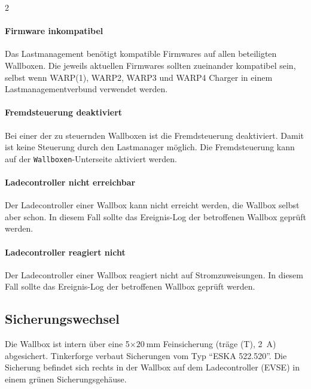 \documentclass[a4paper,10pt]{article}
\begin{document}
\begin{multicols*}{2}
    \paragraph*{Firmware inkompatibel}
    Das Lastmanagement benötigt kompatible Firmwares auf allen beteiligten Wallboxen. Die jeweils aktuellen Firmwares sollten zueinander kompatibel sein,
    selbst wenn WARP(1), WARP2, WARP3 und WARP4 Charger in einem Lastmanagementverbund verwendet werden.

    \paragraph*{Fremdsteuerung deaktiviert}
    Bei einer der zu steuernden Wallboxen ist die Fremdsteuerung deaktiviert. Damit ist keine Steuerung durch den Lastmanager möglich. Die Fremdsteuerung kann auf der \texttt{Wallboxen}-Unterseite aktiviert werden.

    \paragraph*{Ladecontroller nicht erreichbar}
    Der Ladecontroller einer Wallbox kann nicht erreicht werden, die Wallbox
	selbst aber schon. In diesem Fall sollte das Ereignis-Log der betroffenen
	Wallbox geprüft werden.

    \paragraph*{Ladecontroller reagiert nicht}
    Der Ladecontroller einer Wallbox reagiert nicht auf Stromzuweisungen. In diesem Fall sollte das Ereignis-Log der betroffenen Wallbox geprüft werden.

    \subsection{Sicherungswechsel}
    Die Wallbox ist intern über eine 5$\times\SI{20}{\milli\meter}$
	Feinsicherung (träge (T), \SI{2}{\ampere}) abgesichert.
    Tinkerforge verbaut Sicherungen vom Typ \enquote{ESKA 522.520}.
	Die Sicherung befindet sich rechts in der Wallbox auf dem Ladecontroller
	(EVSE) in einem grünen Sicherungsgehäuse.

    \vfill
    \null

\end{multicols*}
\end{document}
